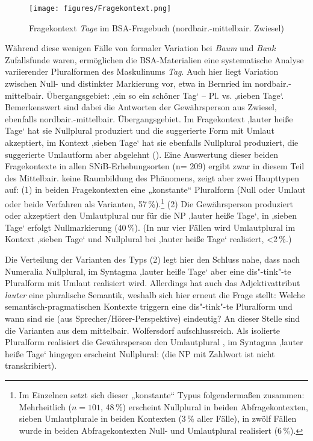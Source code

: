 \begin{figure}
\texttt{[image: figures/Fragekontext.png]}
\caption{Fragekontext \textit{Tage} im BSA-Fragebuch (nordbair.-mittelbair. Zwiesel)}
\label{fig:17}
\end{figure}

Während diese wenigen Fälle von formaler Variation bei \textit{Baum} und \textit{Bank} Zufallsfunde waren, ermöglichen die BSA-Materialien eine systematische Analyse variierender Pluralformen des Maskulinums \textit{Tag}. Auch hier liegt Variation zwischen Null- und distinkter Markierung vor, etwa in Bernried im nordbair.-mittelbair. Übergangsgebiet:      ‚ein so ein schöner Tag‘ -- Pl.  vs.   ‚sieben Tage‘. Bemerkenswert sind dabei die Antworten der Gewährsperson aus Zwiesel, ebenfalls nordbair.-mittelbair. Übergangsgebiet. Im Fragekontext ‚lauter heiße Tage‘ hat sie Nullplural produziert und die suggerierte Form mit Umlaut akzeptiert, im Kontext ‚sieben Tage‘ hat sie ebenfalls Nullplural produziert, die suggerierte Umlautform  aber abgelehnt (). Eine Auswertung dieser beiden Fragekontexte in allen SNiB-Erhebungsorten (n= 209) ergibt zwar in diesem Teil des Mittelbair. keine Raumbildung des Phänomens, zeigt aber zwei Haupttypen auf: (1) in beiden Fragekontexten eine „konstante“ Pluralform (Null oder Umlaut oder beide Verfahren als Varianten, 57\,\%).\footnote{Im Einzelnen setzt sich dieser „konstante“ Typus folgendermaßen zusammen: Mehrheitlich ($n=101$, 48\,\%) erscheint Nullplural in beiden Abfragekontexten, sieben Umlautplurale in beiden Kontexten (3\,\% aller Fälle), in zwölf Fällen wurde in beiden Abfragekontexten Null- und Umlautplural realisiert (6\,\%).} (2) Die Gewährsperson produziert oder akzeptiert den Umlautplural nur für die NP ‚lauter heiße Tage‘, in ‚sieben Tage‘ erfolgt Nullmarkierung (40\,\%). (In nur vier Fällen wird Umlautplural im Kontext ‚sieben Tage‘ und Nullplural bei ‚lauter heiße Tage‘ realisiert, <2\,\%.)

Die Verteilung der Varianten des Typs (2) legt hier den Schluss nahe, dass nach Numeralia Nullplural, im Syntagma ‚lauter heiße Tage‘ aber eine dis"-tink"-te Pluralform mit Umlaut realisiert wird. Allerdings hat auch das Adjektivattribut \textit{lauter} eine pluralische Semantik, weshalb sich hier erneut die Frage stellt: Welche semantisch-pragmatischen Kontexte triggern eine dis"-tink"-te Pluralform und wann sind sie (aus Sprecher/Hörer-Perspektive) eindeutig? An dieser Stelle sind die Varianten aus dem mittelbair. Wolfersdorf aufschlussreich. Als isolierte Pluralform realisiert die Gewährsperson den Umlautplural , im Syntagma ‚lauter heiße Tage‘ hingegen erscheint Nullplural:    (die NP mit Zahlwort ist nicht transkribiert).

